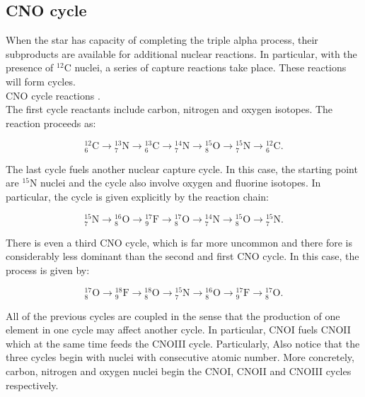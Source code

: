 \documentclass[openany]{book}
\begin{document}
\subsection{CNO cycle}  \label{sub:CNOCycle}

When the star has capacity of completing the triple alpha process, their subproducts are available for additional nuclear reactions. In particular, with the presence of $\mathrm{{}^{12}C}$ nuclei, a series of capture reactions take place. These reactions will form cycles. \\

CNO cycle reactions \cite{wiescher_gorres_schatz_1999}. \\

 The first cycle reactants include carbon, nitrogen and oxygen isotopes. The reaction proceeds as:  

\begin{equation} \label{eq:reaction_CNO_C}
	\mathrm{{}_{6}^{12}C  \rightarrow {}^{13}_{7}N  \rightarrow {}^{13}_{6}C  \rightarrow {}^{14}_{7}N  \rightarrow {}^{15}_{8}O  \rightarrow {}^{15}_{7}N \rightarrow {}^{12}_{6}C}.
\end{equation}

The last cycle fuels another nuclear capture cycle. In this case, the starting point are $\mathrm{{}^{15}N}$ nuclei and the cycle also involve oxygen and fluorine isotopes. In particular, the cycle is given explicitly by the reaction chain: 

\begin{equation} \label{eq:reaction_CNO_N}
	\mathrm{{}_{7}^{15}N  \rightarrow {}^{16}_{8}O  \rightarrow {}^{17}_{9}F  \rightarrow {}^{17}_{8}O  \rightarrow {}^{14}_{7}N  \rightarrow {}^{15}_{8}O \rightarrow {}^{15}_{7}N  }.
\end{equation}

There is even a third CNO cycle, which is far more uncommon and there fore is considerably less dominant than the second and first CNO cycle. In this case, the process is given by: 

\begin{equation} \label{eq:reaction_CNO_O}
	\mathrm{{}_{8}^{17}O  \rightarrow {}^{18}_{9}F  \rightarrow {}^{18}_{8}O  \rightarrow {}^{15}_{7}N  \rightarrow {}^{16}_{8}O  \rightarrow {}^{17}_{9}F \rightarrow {}^{17}_{8}O  }.
\end{equation}

All of the previous cycles are coupled in the sense that the production of one element in one cycle may affect another cycle. In particular, CNOI fuels CNOII which at the same time feeds the CNOIII cycle. Particularly, Also notice that the three cycles begin with nuclei with consecutive atomic number. More concretely, carbon, nitrogen and oxygen nuclei begin the CNOI, CNOII and CNOIII cycles respectively.\\
\end{document}
